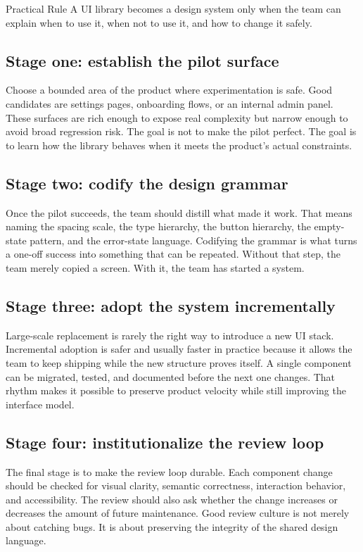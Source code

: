 \documentclass[11pt,twoside,a4paper]{article}
\begin{document}
\begin{highlightbox}{Practical Rule}
A UI library becomes a design system only when the team can explain when to use it, when not to use it, and how to change it safely.
\end{highlightbox}

\subsection{Stage one: establish the pilot surface}
Choose a bounded area of the product where experimentation is safe. Good candidates are settings pages, onboarding flows, or an internal admin panel. These surfaces are rich enough to expose real complexity but narrow enough to avoid broad regression risk. The goal is not to make the pilot perfect. The goal is to learn how the library behaves when it meets the product's actual constraints.

\subsection{Stage two: codify the design grammar}
Once the pilot succeeds, the team should distill what made it work. That means naming the spacing scale, the type hierarchy, the button hierarchy, the empty-state pattern, and the error-state language. Codifying the grammar is what turns a one-off success into something that can be repeated. Without that step, the team merely copied a screen. With it, the team has started a system.

\subsection{Stage three: adopt the system incrementally}
Large-scale replacement is rarely the right way to introduce a new UI stack. Incremental adoption is safer and usually faster in practice because it allows the team to keep shipping while the new structure proves itself. A single component can be migrated, tested, and documented before the next one changes. That rhythm makes it possible to preserve product velocity while still improving the interface model.

\subsection{Stage four: institutionalize the review loop}
The final stage is to make the review loop durable. Each component change should be checked for visual clarity, semantic correctness, interaction behavior, and accessibility. The review should also ask whether the change increases or decreases the amount of future maintenance. Good review culture is not merely about catching bugs. It is about preserving the integrity of the shared design language.
\end{document}
